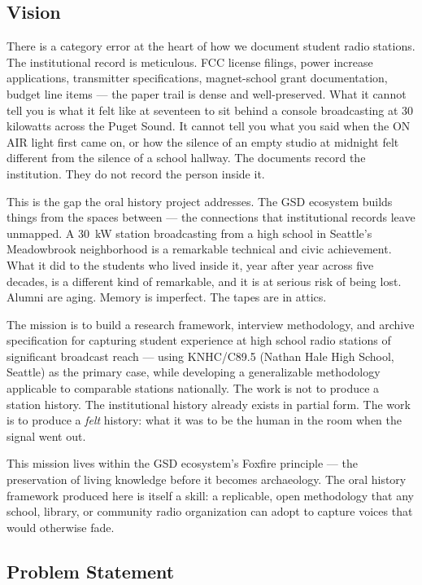 \documentclass[11pt,letterpaper]{article}
\begin{document}
\subsection{Vision}

There is a category error at the heart of how we document student radio stations. The institutional record is meticulous. FCC license filings, power increase applications, transmitter specifications, magnet-school grant documentation, budget line items --- the paper trail is dense and well-preserved. What it cannot tell you is what it felt like at seventeen to sit behind a console broadcasting at 30 kilowatts across the Puget Sound. It cannot tell you what you said when the ON AIR light first came on, or how the silence of an empty studio at midnight felt different from the silence of a school hallway. The documents record the institution. They do not record the person inside it.

This is the gap the oral history project addresses. The GSD ecosystem builds things from the spaces between --- the connections that institutional records leave unmapped. A 30~kW station broadcasting from a high school in Seattle's Meadowbrook neighborhood is a remarkable technical and civic achievement. What it did to the students who lived inside it, year after year across five decades, is a different kind of remarkable, and it is at serious risk of being lost. Alumni are aging. Memory is imperfect. The tapes are in attics.

The mission is to build a research framework, interview methodology, and archive specification for capturing student experience at high school radio stations of significant broadcast reach --- using KNHC/C89.5 (Nathan Hale High School, Seattle) as the primary case, while developing a generalizable methodology applicable to comparable stations nationally. The work is not to produce a station history. The institutional history already exists in partial form. The work is to produce a \textit{felt} history: what it was to be the human in the room when the signal went out.

This mission lives within the GSD ecosystem's Foxfire principle --- the preservation of living knowledge before it becomes archaeology. The oral history framework produced here is itself a skill: a replicable, open methodology that any school, library, or community radio organization can adopt to capture voices that would otherwise fade.

\subsection{Problem Statement}
\end{document}
